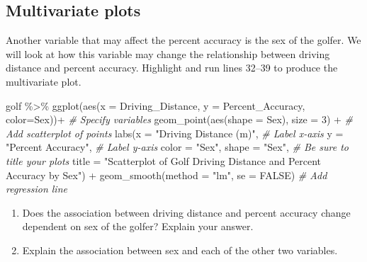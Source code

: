 \documentclass[
]{report}
\newenvironment{Shaded}{\begin{snugshade}}{\end{snugshade}}
\newcommand{\AttributeTok}[1]{\textcolor[rgb]{0.77,0.63,0.00}{#1}}
\newcommand{\CommentTok}[1]{\textcolor[rgb]{0.56,0.35,0.01}{\textit{#1}}}
\newcommand{\ConstantTok}[1]{\textcolor[rgb]{0.00,0.00,0.00}{#1}}
\newcommand{\DecValTok}[1]{\textcolor[rgb]{0.00,0.00,0.81}{#1}}
\newcommand{\FunctionTok}[1]{\textcolor[rgb]{0.00,0.00,0.00}{#1}}
\newcommand{\NormalTok}[1]{#1}
\newcommand{\SpecialCharTok}[1]{\textcolor[rgb]{0.00,0.00,0.00}{#1}}
\newcommand{\StringTok}[1]{\textcolor[rgb]{0.31,0.60,0.02}{#1}}
\begin{document}
\vspace{.8in}

\hypertarget{multivariate-plots}{%
\subsection*{Multivariate plots}\label{multivariate-plots}}

Another variable that may affect the percent accuracy is the sex of the golfer. We will look at how this variable may change the relationship between driving distance and percent accuracy. Highlight and run lines 32--39 to produce the multivariate plot.

\begin{Shaded}
\begin{Highlighting}[]
\NormalTok{golf }\SpecialCharTok{\%\textgreater{}\%}
  \FunctionTok{ggplot}\NormalTok{(}\FunctionTok{aes}\NormalTok{(}\AttributeTok{x =}\NormalTok{ Driving\_Distance, }\AttributeTok{y =}\NormalTok{ Percent\_Accuracy, }\AttributeTok{color=}\NormalTok{Sex))}\SpecialCharTok{+}  \CommentTok{\# Specify variables}
  \FunctionTok{geom\_point}\NormalTok{(}\FunctionTok{aes}\NormalTok{(}\AttributeTok{shape =}\NormalTok{ Sex), }\AttributeTok{size =} \DecValTok{3}\NormalTok{) }\SpecialCharTok{+}  \CommentTok{\# Add scatterplot of points}
  \FunctionTok{labs}\NormalTok{(}\AttributeTok{x =} \StringTok{"Driving Distance (m)"}\NormalTok{,  }\CommentTok{\# Label x{-}axis}
       \AttributeTok{y =} \StringTok{"Percent Accuracy"}\NormalTok{,  }\CommentTok{\# Label y{-}axis}
       \AttributeTok{color =} \StringTok{"Sex"}\NormalTok{, }\AttributeTok{shape =} \StringTok{"Sex"}\NormalTok{,}
       \CommentTok{\# Be sure to title your plots}
       \AttributeTok{title =} \StringTok{"Scatterplot of Golf Driving Distance and Percent Accuracy by Sex"}\NormalTok{) }\SpecialCharTok{+} 
  \FunctionTok{geom\_smooth}\NormalTok{(}\AttributeTok{method =} \StringTok{"lm"}\NormalTok{, }\AttributeTok{se =} \ConstantTok{FALSE}\NormalTok{)  }\CommentTok{\# Add regression line}
\end{Highlighting}
\end{Shaded}

\begin{enumerate}
\def\labelenumi{\arabic{enumi}.}
\setcounter{enumi}{14}
\item
  Does the association between driving distance and percent accuracy change dependent on sex of the golfer? Explain your answer.
  \vspace{1in}
\item
  Explain the association between sex and each of the other two variables.
  \newpage
\end{enumerate}
\end{document}
